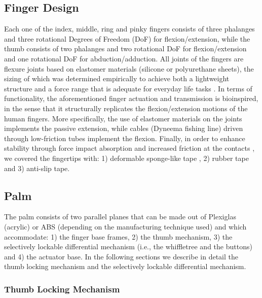 


\subsection{Finger Design}

Each one of the index, middle, ring and pinky fingers consists of three phalanges and three rotational Degrees of Freedom (DoF) for flexion/extension, while the thumb consists of two phalanges and two rotational DoF for flexion/extension and one rotational DoF for abduction/adduction. All joints of the fingers are flexure joints based on elastomer materials (silicone or polyurethane sheets), the sizing of which was determined empirically to achieve both a lightweight structure and a force range that is adequate for everyday life tasks \cite{DollarAR2005}. In terms of functionality, the aforementioned finger actuation and transmission is bioinspired, in the sense that it structurally replicates the flexion/extension motions of the human fingers. More specifically, the use of elastomer materials on the joints implements the passive extension, while cables (Dyneema fishing line) driven through low-friction tubes implement the flexion. Finally, in order to enhance stability through force impact absorption and increased friction at the contacts \cite{deformableciocarlie2005}, we covered the fingertips with: 1) deformable sponge-like tape , 2) rubber tape and 3) anti-slip tape.

\subsection{Palm}

The palm consists of two parallel planes that can be made out of Plexiglas (acrylic) or ABS (depending on the manufacturing technique used) and which  accommodate: 1) the finger base frames, 2) the thumb mechanism, 3) the selectively lockable differential mechanism (i.e., the whiffletree and the buttons) and 4) the actuator base. In the following sections we describe in detail the thumb locking mechanism and the selectively lockable differential mechanism.

  
\subsubsection{Thumb Locking Mechanism}

